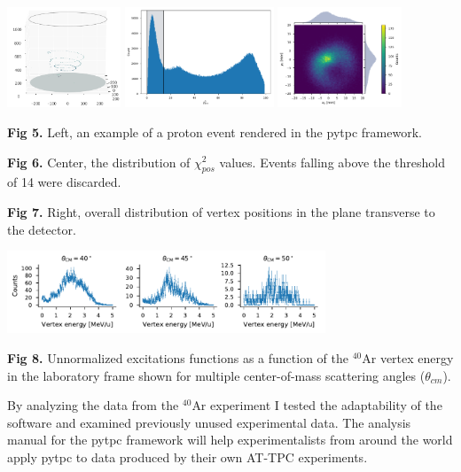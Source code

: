 \documentclass[ansiepaper,portrait]{baposter}
\begin{document}
\begin{poster}
{\begin{center}
\includegraphics[height=30mm]{chamber_plot.png}
\hspace{.75cm}
\includegraphics [height=30mm] {chi2pos.pdf}
\hspace{.75cm}
\includegraphics [height=30mm] {vertex_pos_distrib.pdf}
\end{center}

\small{\textbf{Fig 5.} Left, an example of a proton event rendered in the pytpc framework.}

\small{\textbf{Fig 6.} Center, the distribution of $\chi_{pos}^{2}$ values. Events falling above the threshold of 14 were discarded.}

\small{\textbf{Fig 7.} Right, overall distribution of vertex positions in the plane transverse to the detector.}

\begin{center}
\includegraphics [width=95mm] {angular_excitation_hists_POSTER.pdf}
\end{center}
\small{\textbf{Fig 8.} Unnormalized excitations functions as a function of the $^{40}$Ar vertex energy in the laboratory frame shown for multiple center-of-mass scattering angles ($\theta_{cm}$).}
}

{\small{ By analyzing the data from the $^{40}$Ar experiment I tested the adaptability of the software and examined previously unused experimental data. The analysis manual for the pytpc framework will help experimentalists from around the world apply pytpc to data produced by their own AT-TPC experiments.

}}
\end{poster}
\end{document}
